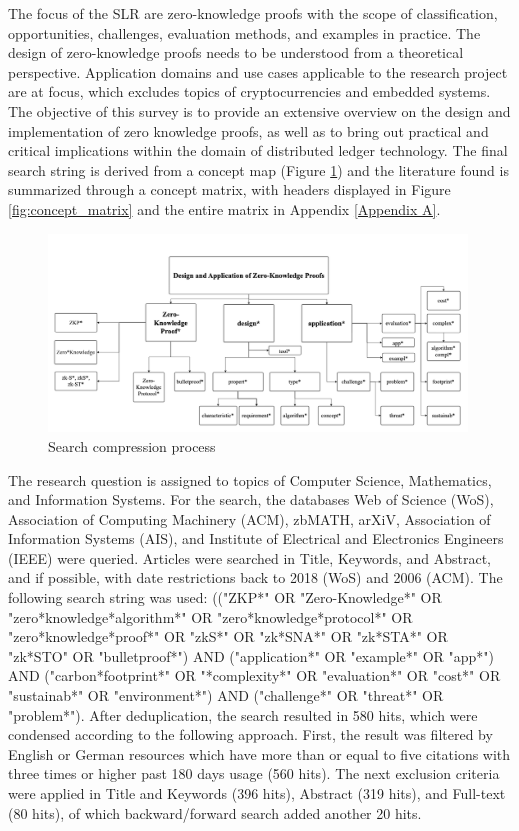 The focus of the SLR are zero-knowledge proofs with the scope of classification, opportunities, challenges, evaluation methods, and examples in practice. The design of zero-knowledge proofs needs to be understood from a theoretical perspective. Application domains and use cases applicable to the research project are at focus, which excludes topics of cryptocurrencies and embedded systems. The objective of this survey is to provide an extensive overview on the design and implementation of zero knowledge proofs, as well as to bring out practical and critical implications within the domain of distributed ledger technology. The final search string is derived from a concept map (Figure \ref{fig:concept_map}) and the literature found is summarized through a concept matrix, with headers displayed in Figure \ref{fig:concept_matrix} and the entire matrix in Appendix \ref{Appendix A}.

\begin{figure}[hbt]
	\centering
		\includegraphics[width=0.99\textwidth]{Pictures/concept map.png}
	\caption{Search compression process}
	\label{fig:concept_map}
\end{figure}

The research question is assigned to topics of Computer Science, Mathematics, and Information Systems. For the search, the databases Web of Science (WoS), Association of Computing Machinery (ACM), zbMATH, arXiV, Association of Information Systems (AIS), and Institute of Electrical and Electronics Engineers (IEEE) were queried. Articles were searched in Title, Keywords, and Abstract, and if possible, with date restrictions back to 2018 (WoS) and 2006 (ACM). The following search string was used: (("ZKP*" OR "Zero-Knowledge*" OR "zero*knowledge*algorithm*" OR "zero*knowledge*protocol*" OR "zero*knowledge*proof*" OR "zkS*" OR "zk*SNA*" OR "zk*STA*" OR "zk*STO" OR "bulletproof*") AND ("application*" OR "example*" OR "app*") AND ("carbon*footprint*" OR "*complexity*" OR "evaluation*" OR "cost*" OR "sustainab*" OR "environment*") AND ("challenge*" OR "threat*" OR "problem*"). After deduplication, the search resulted in 580 hits, which were condensed according to the following approach. First, the result was filtered by English or German resources which have more than or equal to five citations with three times or higher past 180 days usage (560 hits). The next exclusion criteria were applied in Title and Keywords (396 hits), Abstract (319 hits), and Full-text (80 hits), of which backward/forward search added another 20 hits. 

